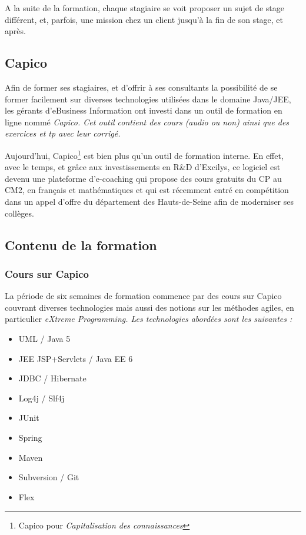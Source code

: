 A la suite de la formation, chaque stagiaire se voit proposer un sujet de stage différent, et, parfois, une mission chez un client jusqu'à la fin de son stage, et après. 

\subsection{Capico}

Afin de former ses stagiaires, et d'offrir à ses consultants la possibilité de se former facilement sur diverses technologies utilisées dans le domaine Java/JEE, les gérants d'eBusiness Information ont investi dans un outil de formation en ligne nommé \em{Capico}. Cet outil contient des cours (audio ou non) ainsi que des exercices et tp avec leur corrigé.

Aujourd'hui, Capico\footnote{Capico pour \em{Capi}talisation des \em{co}nnaissances} est bien plus qu'un outil de formation interne. En effet, avec le temps, et grâce aux investissements en R\&D d'Excilys, ce logiciel est devenu une plateforme d'e-coaching qui propose des cours gratuits du CP au CM2, en français et mathématiques et qui est récemment entré en compétition dans un appel d'offre du département des Hauts-de-Seine afin de moderniser ses collèges.  

\subsection{Contenu de la formation}

\subsubsection{Cours sur Capico}
La période de six semaines de formation commence par des cours sur Capico couvrant diverses technologies mais aussi des notions sur les méthodes agiles, en particulier \em{eXtreme Programming}. Les technologies abordées sont les suivantes :

\begin{itemize}
  \item UML / Java 5
  \item JEE JSP+Servlets / Java EE 6
  \item JDBC / Hibernate
  \item Log4j / Slf4j
  \item JUnit
  \item Spring
  \item Maven
  \item Subversion / Git
  \item Flex
\end{itemize}


